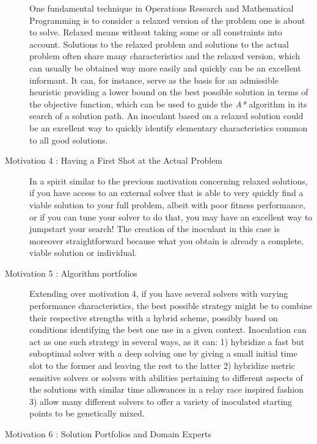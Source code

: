 \documentclass[english]{DESCARWINreport}
\begin{document}
\begin{description}
One fundamental technique in Operations Research and Mathematical Programming is to consider a relaxed version of the problem one is about to solve. Relaxed means without taking some or all constraints into account. Solutions to the relaxed problem and solutions to the actual problem often share many characteristics and the relaxed version, which can usually be obtained way more easily and quickly can be an excellent informant. It can, for instance, serve as the basis for an admissible heuristic providing a lower bound on the best possible solution in terms of the objective function, which can be used to guide the \emph{A*} algorithm in its search of a solution path. An inoculant based on a relaxed solution could be an excellent way to quickly identify elementary characteristics common to all good solutions. 


\item[Motivation 4 : Having a First Shot at the Actual Problem]

In a spirit similar to the previous motivation concerning relaxed solutions, if you have access to an external solver that is able to very quickly find a viable solution to your full problem, albeit with poor fitness performance, or if you can tune your solver to do that, you may have an excellent way to jumpstart your search! The creation of the inoculant in this case is moreover straightforward because what you obtain is already a complete, viable solution or individual.

\item[Motivation 5 : Algorithm portfolios]

Extending over motivation 4, if you have several solvers with varying performance characteristics, the best possible strategy might be to combine their respective strengths with a hybrid scheme, possibly based on conditions identifying the best one use in a given context. Inoculation can act as one such strategy in several ways, as it can: 1) hybridize a fast but suboptimal solver with a deep solving one by giving a small initial time slot to the former and leaving the rest to the latter 2) hybridize metric sensitive solvers or solvers with abilities pertaining to different aspects of the solutions with similar time allowances in a relay race inspired fashion 3) allow many different solvers to offer a variety of inoculated starting points to be genetically mixed.

\item[Motivation 6 : Solution Portfolios and Domain Experts]


\end{description}
\end{document}
